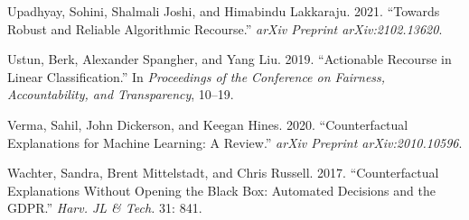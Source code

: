 \documentclass[
]{acmconf}
\newlength{\cslhangindent}
\newlength{\cslentryspacingunit} %
\newenvironment{CSLReferences}[2] %
 {%
  \setlength{\parindent}{0pt}
  \ifodd #1
  \let\oldpar\par
  \def\par{\hangindent=\cslhangindent\oldpar}
  \fi
  \setlength{\parskip}{#2\cslentryspacingunit}
 }%
 {}
\begin{document}
\begin{CSLReferences}{1}{0}
\leavevmode{}%
Upadhyay, Sohini, Shalmali Joshi, and Himabindu Lakkaraju. 2021.
{``Towards Robust and Reliable Algorithmic Recourse.''} \emph{arXiv
Preprint arXiv:2102.13620}.

\leavevmode{}%
Ustun, Berk, Alexander Spangher, and Yang Liu. 2019. {``Actionable
Recourse in Linear Classification.''} In \emph{Proceedings of the
Conference on Fairness, Accountability, and Transparency}, 10--19.

\leavevmode{}%
Verma, Sahil, John Dickerson, and Keegan Hines. 2020. {``Counterfactual
Explanations for Machine Learning: A Review.''} \emph{arXiv Preprint
arXiv:2010.10596}.

\leavevmode{}%
Wachter, Sandra, Brent Mittelstadt, and Chris Russell. 2017.
{``Counterfactual Explanations Without Opening the Black Box: Automated
Decisions and the GDPR.''} \emph{Harv. JL \& Tech.} 31: 841.

\end{CSLReferences}
\end{document}
